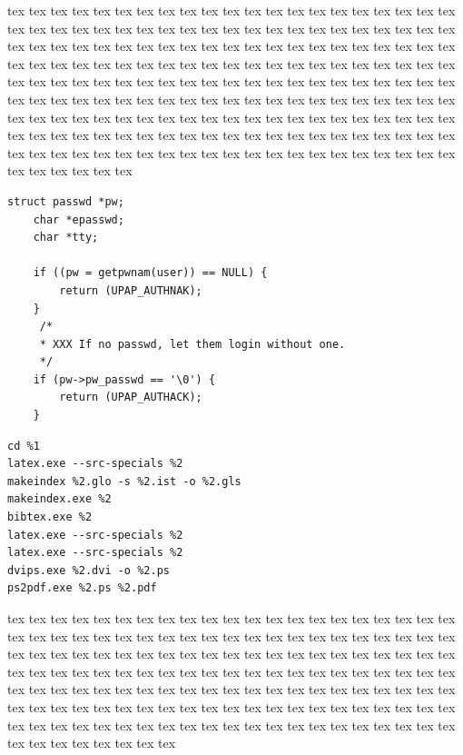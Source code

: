 tex tex tex tex tex tex tex tex tex tex tex tex tex tex tex tex tex tex tex tex tex tex tex tex tex tex tex tex tex tex tex tex tex tex tex tex tex tex tex tex tex tex tex tex tex tex tex tex tex tex tex tex tex tex tex tex tex tex tex tex tex tex tex tex tex tex tex tex tex tex tex tex tex tex tex tex tex tex tex tex tex tex tex tex tex tex tex tex tex tex tex tex tex tex tex tex tex tex tex tex tex tex tex tex tex tex tex tex tex tex tex tex tex tex tex tex tex tex tex tex tex tex tex tex tex tex tex tex tex tex tex tex tex tex tex tex tex tex tex tex tex tex tex tex tex tex tex tex tex tex tex tex tex tex tex tex tex tex tex tex tex tex tex tex tex tex tex tex tex tex tex tex tex tex tex tex tex tex tex tex tex tex tex tex tex tex tex tex tex tex tex tex tex tex tex 

\begin{lstlisting}[numbers=none,frame=single, caption={Listing z ramką},captionpos=b, label=ramka]
    struct passwd *pw;
    char *epasswd;
    char *tty;

    if ((pw = getpwnam(user)) == NULL) {
        return (UPAP_AUTHNAK);
    }
     /*
     * XXX If no passwd, let them login without one.
     */
    if (pw->pw_passwd == '\0') {
        return (UPAP_AUTHACK);
    }
\end{lstlisting}

\begin{lstlisting}[numbers=none,frame=single, caption={Kompilacja finalna dokumentu do pdf'u dla programu LED},captionpos=b, label=napdf]
%3
cd %1
latex.exe --src-specials %2
makeindex %2.glo -s %2.ist -o %2.gls
makeindex.exe %2
bibtex.exe %2
latex.exe --src-specials %2
latex.exe --src-specials %2
dvips.exe %2.dvi -o %2.ps
ps2pdf.exe %2.ps %2.pdf
\end{lstlisting}

tex tex tex tex tex tex tex tex tex tex tex tex tex tex tex tex tex tex tex tex tex tex tex tex tex tex tex tex tex tex tex tex tex tex tex tex tex tex tex tex tex tex tex tex tex tex tex tex tex tex tex tex tex tex tex tex tex tex tex tex tex tex tex tex tex tex tex tex tex tex tex tex tex tex tex tex tex tex tex tex tex tex tex tex tex tex tex tex tex tex tex tex tex tex tex tex tex tex tex tex tex tex tex tex tex tex tex tex tex tex tex tex tex tex tex tex tex tex tex tex tex tex tex tex tex tex tex tex tex tex tex tex tex tex tex tex tex tex tex tex tex tex tex tex tex tex tex tex tex tex tex tex tex tex tex 




